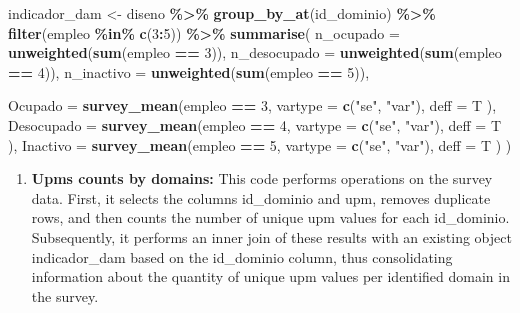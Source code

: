 \documentclass[
  12pt,
]{book}
\newenvironment{Shaded}{\begin{snugshade}}{\end{snugshade}}
\newcommand{\AttributeTok}[1]{\textcolor[rgb]{0.13,0.29,0.53}{#1}}
\newcommand{\DecValTok}[1]{\textcolor[rgb]{0.00,0.00,0.81}{#1}}
\newcommand{\FunctionTok}[1]{\textcolor[rgb]{0.13,0.29,0.53}{\textbf{#1}}}
\newcommand{\NormalTok}[1]{#1}
\newcommand{\OtherTok}[1]{\textcolor[rgb]{0.56,0.35,0.01}{#1}}
\newcommand{\SpecialCharTok}[1]{\textcolor[rgb]{0.81,0.36,0.00}{\textbf{#1}}}
\newcommand{\StringTok}[1]{\textcolor[rgb]{0.31,0.60,0.02}{#1}}
\providecommand{\tightlist}{%
  \setlength{\itemsep}{0pt}\setlength{\parskip}{0pt}}
\begin{document}
\begin{Shaded}
\begin{Highlighting}[]
\NormalTok{indicador\_dam }\OtherTok{\textless{}{-}}
\NormalTok{  diseno }\SpecialCharTok{\%\textgreater{}\%} \FunctionTok{group\_by\_at}\NormalTok{(id\_dominio) }\SpecialCharTok{\%\textgreater{}\%} 
  \FunctionTok{filter}\NormalTok{(empleo }\SpecialCharTok{\%in\%} \FunctionTok{c}\NormalTok{(}\DecValTok{3}\SpecialCharTok{:}\DecValTok{5}\NormalTok{)) }\SpecialCharTok{\%\textgreater{}\%}
  \FunctionTok{summarise}\NormalTok{(}
    \AttributeTok{n\_ocupado =} \FunctionTok{unweighted}\NormalTok{(}\FunctionTok{sum}\NormalTok{(empleo }\SpecialCharTok{==} \DecValTok{3}\NormalTok{)),}
    \AttributeTok{n\_desocupado =} \FunctionTok{unweighted}\NormalTok{(}\FunctionTok{sum}\NormalTok{(empleo }\SpecialCharTok{==} \DecValTok{4}\NormalTok{)),}
    \AttributeTok{n\_inactivo =} \FunctionTok{unweighted}\NormalTok{(}\FunctionTok{sum}\NormalTok{(empleo }\SpecialCharTok{==} \DecValTok{5}\NormalTok{)),}

    \AttributeTok{Ocupado =} \FunctionTok{survey\_mean}\NormalTok{(empleo }\SpecialCharTok{==} \DecValTok{3}\NormalTok{,}
      \AttributeTok{vartype =} \FunctionTok{c}\NormalTok{(}\StringTok{"se"}\NormalTok{,  }\StringTok{"var"}\NormalTok{),}
      \AttributeTok{deff =}\NormalTok{ T}
\NormalTok{    ),}
    \AttributeTok{Desocupado =} \FunctionTok{survey\_mean}\NormalTok{(empleo }\SpecialCharTok{==} \DecValTok{4}\NormalTok{,}
                          \AttributeTok{vartype =} \FunctionTok{c}\NormalTok{(}\StringTok{"se"}\NormalTok{,  }\StringTok{"var"}\NormalTok{),}
                          \AttributeTok{deff =}\NormalTok{ T}
\NormalTok{    ),}
    \AttributeTok{Inactivo =} \FunctionTok{survey\_mean}\NormalTok{(empleo }\SpecialCharTok{==} \DecValTok{5}\NormalTok{,}
                          \AttributeTok{vartype =} \FunctionTok{c}\NormalTok{(}\StringTok{"se"}\NormalTok{,  }\StringTok{"var"}\NormalTok{),}
                          \AttributeTok{deff =}\NormalTok{ T}
\NormalTok{    )}
\NormalTok{  )}
\end{Highlighting}
\end{Shaded}

\begin{enumerate}
\def\labelenumi{\arabic{enumi}.}
\setcounter{enumi}{2}
\tightlist
\item
  \textbf{Upms counts by domains:} This code performs operations on the survey data. First, it selects the columns id\_dominio and upm, removes duplicate rows, and then counts the number of unique upm values for each id\_dominio. Subsequently, it performs an inner join of these results with an existing object indicador\_dam based on the id\_dominio column, thus consolidating information about the quantity of unique upm values per identified domain in the survey.
\end{enumerate}
\end{document}
